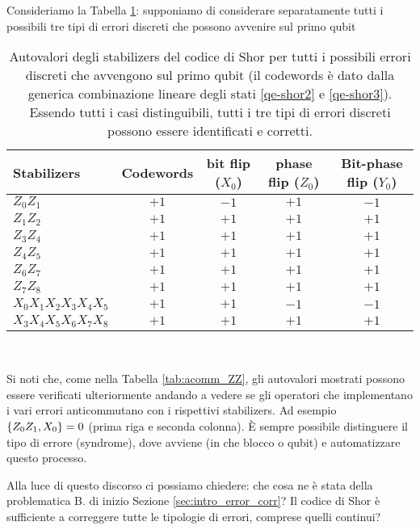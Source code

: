 \begin{esempio}
Consideriamo la Tabella \ref{tab:Shor_first_qubit_errors}: supponiamo di considerare separatamente tutti i possibili tre tipi di errori discreti che possono avvenire sul primo qubit
    \begin{table}[!ht]
	\centering
        \begin{tabular}{lcccc}
            \toprule
            Stabilizers & Codewords & bit flip ($X_0$) & phase flip ($Z_0$) & Bit-phase flip ($Y_0$) \\
            \midrule
            $Z_0Z_1$ & $+1$ & $-1$ & $+1$ & $-1$ \\
            $Z_1Z_2$ & $+1$ & $+1$ & $+1$ & $+1$ \\
            $Z_3Z_4$ & $+1$ & $+1$ & $+1$ & $+1$ \\
            $Z_4Z_5$ & $+1$ & $+1$ & $+1$ & $+1$ \\
            $Z_6Z_7$ & $+1$ & $+1$ & $+1$ & $+1$ \\
            $Z_7Z_8$ & $+1$ & $+1$ & $+1$ & $+1$ \\
            $X_0X_1X_2X_3X_4X_5$ & $+1$ & $+1$ & $-1$ & $-1$ \\
            $X_3X_4X_5X_6X_7X_8$ & $+1$ & $+1$ & $+1$ & $+1$ \\
            \bottomrule
        \end{tabular}\\
        \caption{Autovalori degli stabilizers del codice di Shor per tutti i possibili errori discreti che avvengono sul primo qubit (il codewords è dato dalla generica combinazione lineare degli stati \eqref{qe-shor2} e \eqref{qe-shor3}). Essendo tutti i casi distinguibili,  tutti i tre tipi di errori discreti possono essere identificati e corretti. }\label{tab:Shor_first_qubit_errors}
    \end{table}
    
    \noindent Si noti che, come nella Tabella \ref{tab:acomm_ZZ}, gli autovalori mostrati possono essere verificati ulteriormente andando a vedere se gli operatori che implementano i vari errori anticommutano con i rispettivi stabilizers. Ad esempio $\acomm{Z_0Z_1}{X_0}=0$ (prima riga e seconda colonna). È sempre possibile distinguere il tipo di errore (syndrome), dove avviene (in che blocco o qubit) e automatizzare questo processo.
\end{esempio}

\noindent Alla luce di questo discorso ci possiamo chiedere: che cosa ne è stata della problematica B. di inizio Sezione \ref{sec:intro_error_corr}? Il codice di Shor è sufficiente a correggere tutte le tipologie di errori, comprese quelli continui? 

